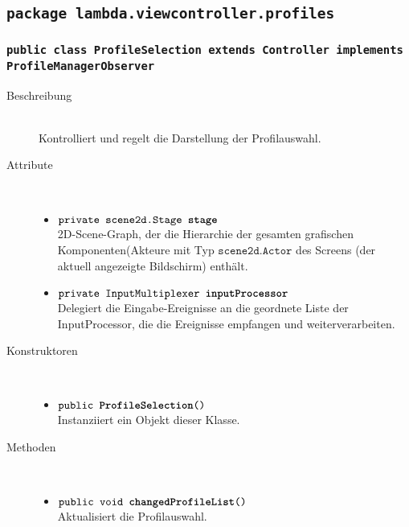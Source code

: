 \subsection{\texttt{package lambda.viewcontroller.profiles}}

\subsubsection{\normalfont \texttt{public class \textbf{ProfileSelection} extends Controller implements ProfileManagerObserver}}

\begin{description}
\item[Beschreibung] \hfill \\ Kontrolliert und regelt die Darstellung der Profilauswahl.
\item[Attribute] \hfill \\
	\vspace{-.8cm}
	\begin{itemize}
		\item $\texttt{private scene2d.Stage \textbf{stage}}$ \\ 2D-Scene-Graph, der die Hierarchie der gesamten grafischen Komponenten(Akteure mit Typ $\texttt{scene2d.Actor}$ des Screens (der aktuell angezeigte Bildschirm) enthält. 
		\item $\texttt{private InputMultiplexer \textbf{inputProcessor}}$ \\ Delegiert die Eingabe-Ereignisse an die geordnete Liste der InputProcessor, die die Ereignisse empfangen und weiterverarbeiten.
	\end{itemize}
	
\item[Konstruktoren] \hfill \\
	\vspace{-.8cm}
	\begin{itemize}
		\item $\texttt{public \textbf{ProfileSelection}()}$ \\ Instanziiert ein Objekt dieser Klasse.
	\end{itemize}
	
\item[Methoden] \hfill \\
	\vspace{-.8cm}
	\begin{itemize}		
		\item $\texttt{public void \textbf{changedProfileList}()}$ \\ Aktualisiert die Profilauswahl.
		

\end{itemize}
\end{description}
